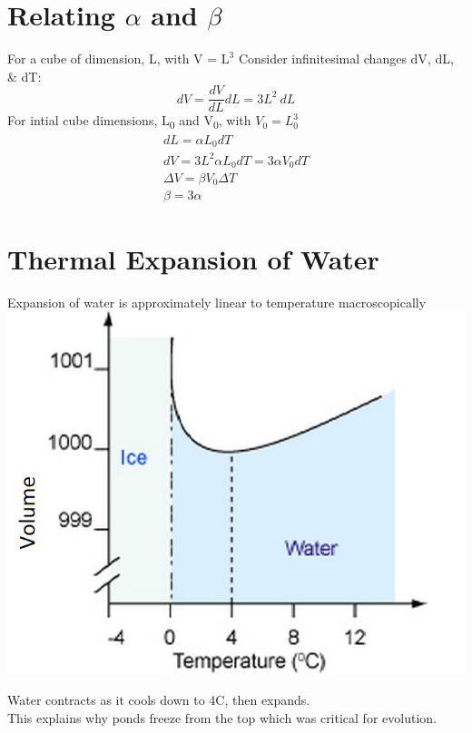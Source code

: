 \documentclass[a4paper, 11pt, fleqn, normalem]{report}
\begin{document}
\section{Relating ${\alpha}$ and ${\beta}$}
For a cube of dimension, L, with V = $\text{L}^{3}$
Consider infinitesimal changes dV, dL, \& dT:
\begin{equation*}
	dV = \dfrac{dV}{dL}dL = 3L^{2}~dL
\end{equation*}
For intial cube dimensions, L\textsubscript{0} and V\textsubscript{0}, with $V_{0} = L_{0}^{3}$
\begin{gather*}
	dL = {\alpha}L_{0}dT \\
	dV = 3L^{2}{\alpha}L_{0}dT = 3{\alpha}V_{0}dT \\
	{\Delta}V = {\beta}V_{0}{\Delta}T \\
	\beta = 3\alpha
\end{gather*}

\section{Thermal Expansion of Water}
Expansion of water is approximately linear to temperature macroscopically \\
\includegraphics[scale=0.4]{water.png}

Water contracts as it cools down to 4{\textdegree}C, then expands. \\
This explains why ponds freeze from the top which was critical for evolution.
\end{document}
